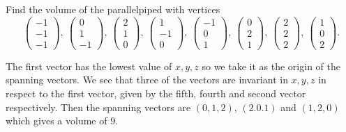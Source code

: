 \documentclass[10pt,notitlepage]{revtex4-1}
\newenvironment{example}[1][Example]{\begin{trivlist}
\item[\hskip \labelsep {\bfseries #1}]}{\end{trivlist}}
\begin{document}
\begin{example}
	Find the volume of the parallelpiped with vertices
	\begin{equation}
		\begin{pmatrix}-1\\-1\\-1\end{pmatrix},\
		\begin{pmatrix}0\\1\\-1\end{pmatrix},\
		\begin{pmatrix}2\\1\\0\end{pmatrix},\
		\begin{pmatrix}1\\-1\\0\end{pmatrix},\
		\begin{pmatrix}-1\\0\\1\end{pmatrix},\
		\begin{pmatrix}0\\2\\1\end{pmatrix},\
		\begin{pmatrix}2\\2\\2\end{pmatrix},\
		\begin{pmatrix}1\\0\\2\end{pmatrix}.
	\end{equation}
	
	The first vector has the lowest value of $x,y,z$ so we take it as the origin
	of the spanning vectors. We see that three of the vectors are invariant in
	$x,y,z$ in respect to the first vector, given by the fifth, fourth and
	second vector respectively. Then the spanning vectors are $(0,1,2)$,
	$(2.0.1)$ and $(1,2,0)$ which gives a volume of $9$.
\end{example}
\end{document}
